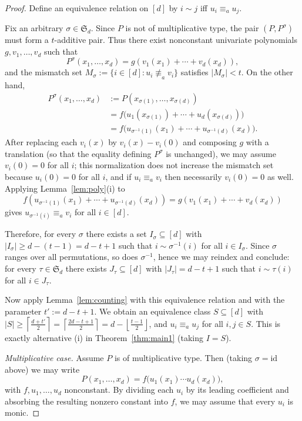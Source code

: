 \documentclass[10pt,a4paper]{amsart}
\begin{document}
\begin{proof}
Define an equivalence relation on $[d]$ by $i\sim j$ iff $u_i\equiv_a u_j$.

Fix an arbitrary $\sigma\in\mathfrak S_d$.
Since $P$ is not of multiplicative type, the pair $(P,P^{\sigma})$ must form a $t$-additive pair.
Thus there exist nonconstant univariate polynomials $g,v_1,\ldots,v_d$ such that
$$P^{\sigma}(x_1,\ldots,x_d)=g(v_1(x_1)+\cdots+v_d(x_d)),$$
and the mismatch set
$M_{\sigma}:=\{i\in[d]: u_i\not\equiv_a v_i\}$
satisfies $|M_{\sigma}|<t$.
On the other hand,
\begin{align*}
P^{\sigma}(x_1,\ldots,x_d)
&:=P(x_{\sigma(1)},\ldots,x_{\sigma(d)})\\
&=f\big(u_1(x_{\sigma(1)})+\cdots+u_d(x_{\sigma(d)})\big)\\
&=f\big(u_{\sigma^{-1}(1)}(x_1)+\cdots+u_{\sigma^{-1}(d)}(x_d)\big).
\end{align*}
After replacing each $v_i(x)$ by $v_i(x)-v_i(0)$ and composing $g$ with a translation (so that the equality defining $P^\sigma$ is unchanged),
we may assume $v_i(0)=0$ for all $i$; this normalization does not increase the mismatch set because $u_i(0)=0$ for all $i$, and if $u_i\equiv_a v_i$ then necessarily $v_i(0)=0$ as well.
Applying Lemma~\ref{lem:poly}(i) to
$$f(u_{\sigma^{-1}(1)}(x_1)+\cdots+u_{\sigma^{-1}(d)}(x_d))
=g(v_1(x_1)+\cdots+v_d(x_d))$$
gives $u_{\sigma^{-1}(i)}\equiv_a v_i$ for all $i\in[d]$.

Therefore, for every $\sigma$ there exists a set $I_{\sigma}\subseteq[d]$ with
$|I_{\sigma}|\ge d-(t-1)=d-t+1$
such that $i\sim \sigma^{-1}(i)$ for all $i\in I_{\sigma}$.
Since $\sigma$ ranges over all permutations, so does $\sigma^{-1}$, hence we may reindex and conclude:
for every $\tau\in\mathfrak S_d$ there exists $J_{\tau}\subseteq[d]$ with $|J_{\tau}|=d-t+1$ such that
$i\sim \tau(i)$ for all $i\in J_{\tau}$.

Now apply Lemma~\ref{lem:counting} with this equivalence relation and with the parameter
$t':=d-t+1$.
We obtain an equivalence class $S\subseteq[d]$ with
$|S|\ge \left\lceil \frac{d+t'}2\right\rceil
=\left\lceil \frac{2d-t+1}{2}\right\rceil
=d-\left\lfloor \frac{t-1}{2}\right\rfloor$,
and $u_i\equiv_a u_j$ for all $i,j\in S$.
This is exactly alternative (i) in Theorem~\ref{thm:main1} (taking $I=S$).

\smallskip
\noindent\emph{Multiplicative case.}
Assume $P$ is of multiplicative type. Then (taking $\sigma=\mathrm{id}$ above) we may write
\[
P(x_1,\ldots,x_d)=f\big(u_1(x_1)\cdots u_d(x_d)\big),
\]
with $f,u_1,\ldots,u_d$ nonconstant.
By dividing each $u_i$ by its leading coefficient and absorbing the resulting nonzero constant into $f$,
we may assume that every $u_i$ is monic.


\end{proof}
\end{document}
